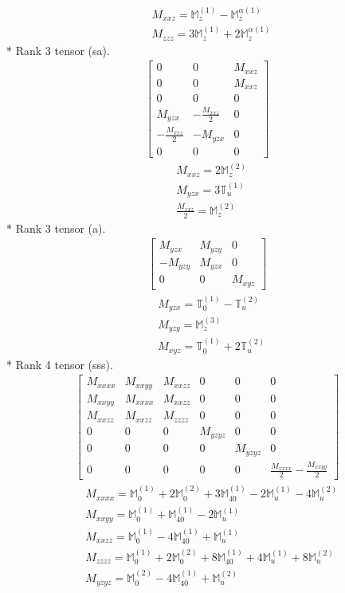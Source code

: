 \documentclass[fleqn,8pt,landscape]{jsarticle}
\begin{document}
\begin{align*}
& M_{xxz} = \mathbb{M}_{z}^{(1)} - \mathbb{M}_{z}^{\alpha(1)} \\
& M_{zzz} = 3 \mathbb{M}_{z}^{(1)} + 2 \mathbb{M}_{z}^{\alpha(1)}
\end{align*}
* Rank 3 tensor (sa).
\begin{align*}
\begin{bmatrix} 0 & 0 & M_{xxz} \\ 0 & 0 & M_{xxz} \\ 0 & 0 & 0 \\ M_{yzx} & - \frac{M_{xxz}}{2} & 0 \\ - \frac{M_{xxz}}{2} & - M_{yzx} & 0 \\ 0 & 0 & 0 \end{bmatrix}
\end{align*}
\begin{align*}
& M_{xxz} = 2 \mathbb{M}_{z}^{(2)} \\
& M_{yzx} = 3 \mathbb{T}_{u}^{(1)} \\
& \frac{M_{xxz}}{2} = \mathbb{M}_{z}^{(2)}
\end{align*}
* Rank 3 tensor (a).
\begin{align*}
\begin{bmatrix} M_{yzx} & M_{yzy} & 0 \\ - M_{yzy} & M_{yzx} & 0 \\ 0 & 0 & M_{xyz} \end{bmatrix}
\end{align*}
\begin{align*}
& M_{yzx} = \mathbb{T}_{0}^{(1)} - \mathbb{T}_{u}^{(2)} \\
& M_{yzy} = \mathbb{M}_{z}^{(3)} \\
& M_{xyz} = \mathbb{T}_{0}^{(1)} + 2 \mathbb{T}_{u}^{(2)}
\end{align*}
* Rank 4 tensor (sss).
\begin{align*}
\begin{bmatrix} M_{xxxx} & M_{xxyy} & M_{xxzz} & 0 & 0 & 0 \\ M_{xxyy} & M_{xxxx} & M_{xxzz} & 0 & 0 & 0 \\ M_{xxzz} & M_{xxzz} & M_{zzzz} & 0 & 0 & 0 \\ 0 & 0 & 0 & M_{yzyz} & 0 & 0 \\ 0 & 0 & 0 & 0 & M_{yzyz} & 0 \\ 0 & 0 & 0 & 0 & 0 & \frac{M_{xxxx}}{2} - \frac{M_{xxyy}}{2} \end{bmatrix}
\end{align*}
\begin{align*}
& M_{xxxx} = \mathbb{M}_{0}^{(1)} + 2 \mathbb{M}_{0}^{(2)} + 3 \mathbb{M}_{40}^{(1)} - 2 \mathbb{M}_{u}^{(1)} - 4 \mathbb{M}_{u}^{(2)} \\
& M_{xxyy} = \mathbb{M}_{0}^{(1)} + \mathbb{M}_{40}^{(1)} - 2 \mathbb{M}_{u}^{(1)} \\
& M_{xxzz} = \mathbb{M}_{0}^{(1)} - 4 \mathbb{M}_{40}^{(1)} + \mathbb{M}_{u}^{(1)} \\
& M_{zzzz} = \mathbb{M}_{0}^{(1)} + 2 \mathbb{M}_{0}^{(2)} + 8 \mathbb{M}_{40}^{(1)} + 4 \mathbb{M}_{u}^{(1)} + 8 \mathbb{M}_{u}^{(2)} \\
& M_{yzyz} = \mathbb{M}_{0}^{(2)} - 4 \mathbb{M}_{40}^{(1)} + \mathbb{M}_{u}^{(2)}
\end{align*}
\end{document}
